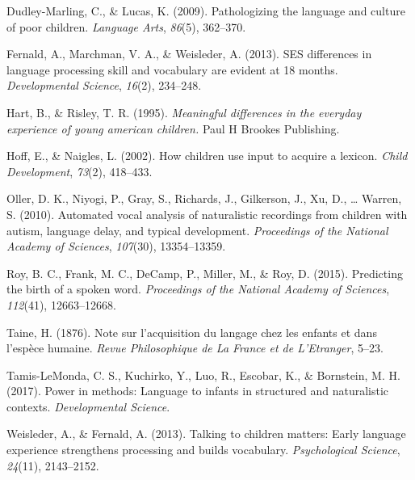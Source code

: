 \documentclass[floatsintext,man]{apa6}
\theoremstyle{definition}
\theoremstyle{definition}
\theoremstyle{definition}
\theoremstyle{remark}
\begin{document}
\hypertarget{ref-dudley2009pathologizing}{}
Dudley-Marling, C., \& Lucas, K. (2009). Pathologizing the language and
culture of poor children. \emph{Language Arts}, \emph{86}(5), 362--370.

\hypertarget{ref-fernald2013ses}{}
Fernald, A., Marchman, V. A., \& Weisleder, A. (2013). SES differences
in language processing skill and vocabulary are evident at 18 months.
\emph{Developmental Science}, \emph{16}(2), 234--248.

\hypertarget{ref-hart1995meaningful}{}
Hart, B., \& Risley, T. R. (1995). \emph{Meaningful differences in the
everyday experience of young american children.} Paul H Brookes
Publishing.

\hypertarget{ref-hoff2002children}{}
Hoff, E., \& Naigles, L. (2002). How children use input to acquire a
lexicon. \emph{Child Development}, \emph{73}(2), 418--433.

\hypertarget{ref-oller2010automated}{}
Oller, D. K., Niyogi, P., Gray, S., Richards, J., Gilkerson, J., Xu, D.,
\ldots{} Warren, S. (2010). Automated vocal analysis of naturalistic
recordings from children with autism, language delay, and typical
development. \emph{Proceedings of the National Academy of Sciences},
\emph{107}(30), 13354--13359.

\hypertarget{ref-roy2015predicting}{}
Roy, B. C., Frank, M. C., DeCamp, P., Miller, M., \& Roy, D. (2015).
Predicting the birth of a spoken word. \emph{Proceedings of the National
Academy of Sciences}, \emph{112}(41), 12663--12668.

\hypertarget{ref-taine1876note}{}
Taine, H. (1876). Note sur l'acquisition du langage chez les enfants et
dans l'espèce humaine. \emph{Revue Philosophique de La France et de
L'Etranger}, 5--23.

\hypertarget{ref-tamis2017power}{}
Tamis-LeMonda, C. S., Kuchirko, Y., Luo, R., Escobar, K., \& Bornstein,
M. H. (2017). Power in methods: Language to infants in structured and
naturalistic contexts. \emph{Developmental Science}.

\hypertarget{ref-weisleder2013talking}{}
Weisleder, A., \& Fernald, A. (2013). Talking to children matters: Early
language experience strengthens processing and builds vocabulary.
\emph{Psychological Science}, \emph{24}(11), 2143--2152.
\end{document}
